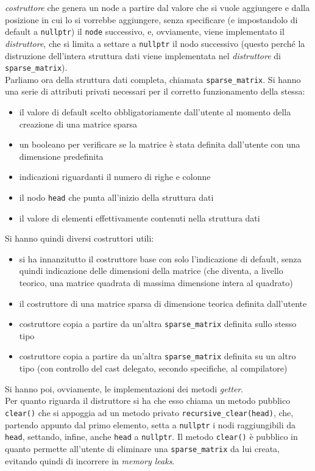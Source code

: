 \documentclass[a4paper,12pt, oneside]{article}
\begin{document}
\textit{costruttore} che genera un node a partire dal valore che si vuole
aggiungere e dalla posizione in cui lo si vorrebbe aggiungere, senza
specificare (e impostandolo di default a \texttt{nullptr}) il
\texttt{node} successivo, e, ovviamente, viene implementato il
\textit{distruttore}, che si limita a settare a \texttt{nullptr} il
nodo successivo (questo perché la distruzione dell'intera struttura
dati viene implementata nel \textit{distruttore} di
\texttt{sparse\_matrix}).\\
Parliamo ora della struttura dati completa, chiamata
\texttt{sparse\_matrix}. Si hanno una serie di attributi privati
necessari per il corretto funzionamento della stessa:
\begin{itemize}
  \item il valore di default scelto obbligatoriamente dall'utente al
  momento della creazione di una matrice sparsa
  \item un booleano per verificare se la matrice è stata definita
  dall'utente con una dimensione predefinita
  \item indicazioni riguardanti il numero di righe e colonne
  \item il nodo \texttt{head} che punta all'inizio della struttura
  dati
  \item il valore di elementi effettivamente contenuti nella struttura dati
\end{itemize}
Si hanno quindi diversi costruttori utili:
\begin{itemize}
  \item si ha innanzitutto il costruttore base con solo l'indicazione
  di default, senza quindi indicazione delle dimensioni della matrice
  (che diventa, a livello teorico, una matrice quadrata di massima
  dimensione intera al quadrato)
  \item il costruttore di una matrice sparsa di dimensione teorica
  definita dall'utente
  \item costruttore copia a partire da un'altra
  \texttt{sparse\_matrix} definita sullo stesso tipo
  \item costruttore copia a partire da un'altra
  \texttt{sparse\_matrix} definita su un altro tipo (con controllo del
  cast delegato, secondo specifiche, al compilatore)
\end{itemize}
Si hanno poi, ovviamente, le implementazioni dei metodi
\textit{getter}.\\
Per quanto riguarda il distruttore si ha che esso chiama un metodo
pubblico \texttt{clear()} che si appoggia ad un metodo privato
\texttt{recursive\_clear(head)}, che, partendo appunto dal primo
elemento, setta a \texttt{nullptr} i nodi raggiungibili da
\texttt{head}, settando, infine, anche \texttt{head} a
\texttt{nullptr}. Il metodo \texttt{clear()} è pubblico in quanto
permette all'utente di eliminare una \texttt{sparse\_matrix} da lui
creata, evitando quindi di incorrere in \textit{memory leaks}.
\newpage
\end{document}
